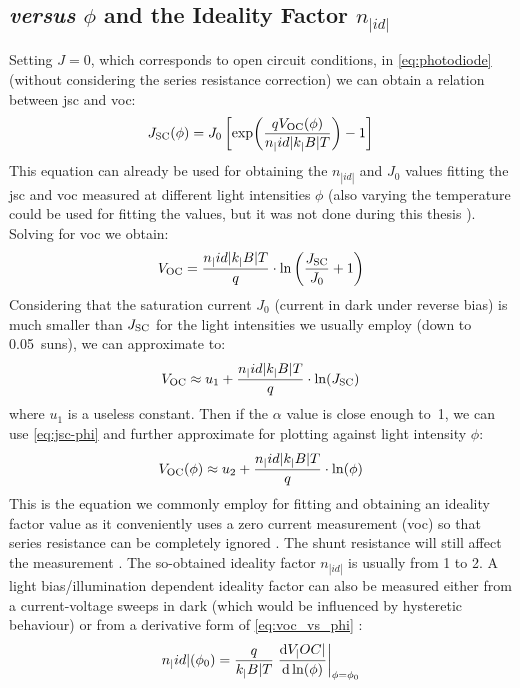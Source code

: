 	\subsection{ \textsl{versus} $\phi$ and the Ideality Factor $n_|id|$}\label{characterization_ideality}
		Setting $J=0$, which corresponds to open circuit conditions, in \cref{eq:photodiode} (without considering the series resistance correction) we can obtain a relation between \gls{jsc} and \gls{voc}:
		\begin{equation}
			J_\mathrm{SC}(\phi) = J_0\left[\exp(\frac{qV_\mathrm{OC} (\phi)}{n_|id|k_|B|T})-1\right]
		\end{equation}
		This equation can already be used for obtaining the $n_|id|$ and $J_0$ values fitting the \gls{jsc} and \gls{voc} measured at different light intensities $\phi$ (also varying the temperature could be used for fitting the values, but it was not done during this thesis \cite{Tvingstedt2016}).
		Solving for \gls{voc} we obtain:
		\begin{equation}V_\mathrm{OC} = \frac{n_|id|k_|B|T}{q}\cdot\ln\left(\frac{J_\mathrm{SC}}{J_0} + 1\right)\end{equation}
		Considering that the saturation current $J_0$ (current in dark under reverse bias) is much smaller than $J_\mathrm{SC}$ for the light intensities we usually employ (down to \SI{0.05}{suns}), we can approximate to:
		\begin{equation}
			V_\mathrm{OC} \approx u_1 + \frac{n_|id|k_|B|T}{q}\cdot\ln(J_\mathrm{SC})
		\end{equation}
		where $u_1$ is a useless constant.
		Then if the $\alpha$ value is close enough to~1, we can use \cref{eq:jsc-phi} and further approximate for plotting against light intensity $\phi$:
		\begin{equation}\label{eq:voc_vs_phi}
			V_\mathrm{OC} (\phi) \approx u_2 + \frac{n_|id|k_|B|T}{q}\cdot\ln(\phi)
		\end{equation}
		This is the equation we commonly employ for fitting and obtaining an ideality factor value \cite{Nelson2003} as it conveniently uses a zero current measurement (\gls{voc}) so that series resistance can be completely ignored \cite{Kirchartz2012}.
		The shunt resistance will still affect the measurement \cite{Tvingstedt2017}.
		The so-obtained ideality factor $n_|id|$ is usually from 1 to 2.
		A light bias/illumination dependent ideality factor can also be measured either from a current-voltage sweeps in dark (which would be influenced by hysteretic behaviour) or from a derivative form of \cref{eq:voc_vs_phi} \cite{Calado2019}:
		\begin{equation}
			n_|id|(\phi_0) = \frac{q}{k_|B|T} \eval{\dv{V_|OC|}{\ln(\phi)}}_{\phi=\phi_0}
		\end{equation}

